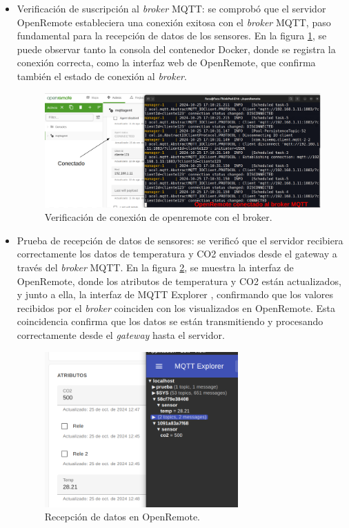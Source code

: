 \begin{itemize}
    \item Verificación de suscripción al \textit{broker} MQTT: se comprobó que el servidor OpenRemote estableciera una conexión exitosa con el \textit{broker} MQTT, paso fundamental para la recepción de datos de los sensores. En la figura \ref{fig:op_broker}, se puede observar tanto la consola del contenedor Docker, donde se registra la conexión correcta, como la interfaz web de OpenRemote, que confirma también el estado de conexión al \textit{broker}.
    
\begin{figure}[H]
\centering 
\includegraphics[width=1\textwidth]{./Figures/op_broker.png}
\caption{Verificación de conexión de openremote con el broker.}
\label{fig:op_broker}
\end{figure}

    
    \item Prueba de recepción de datos de sensores: se verificó que el servidor recibiera correctamente los datos de temperatura y CO2 enviados desde el gateway a través del \textit{broker} MQTT. En la figura \ref{fig:op_datos}, se muestra la interfaz de OpenRemote, donde los atributos de temperatura y CO2 están actualizados, y junto a ella, la interfaz de MQTT Explorer \citep{mqttexplorer}, confirmando que los valores recibidos por el \textit{broker} coinciden con los visualizados en OpenRemote. Esta coincidencia confirma que los datos se están transmitiendo y procesando correctamente desde el \textit{gateway} hasta el servidor.
    
    
\begin{figure}[H]
\centering 
\includegraphics[width=0.7\textwidth]{./Figures/op_datos.png}
\caption{Recepción de datos en OpenRemote.}
\label{fig:op_datos}
\end{figure}   
    

\end{itemize}
